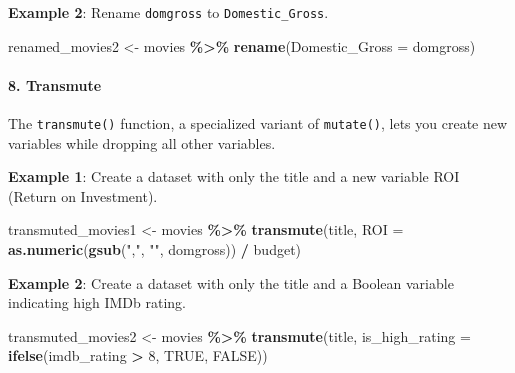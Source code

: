 \documentclass[
]{book}
\newenvironment{Shaded}{\begin{snugshade}}{\end{snugshade}}
\newcommand{\AttributeTok}[1]{\textcolor[rgb]{0.13,0.29,0.53}{#1}}
\newcommand{\ConstantTok}[1]{\textcolor[rgb]{0.56,0.35,0.01}{#1}}
\newcommand{\DecValTok}[1]{\textcolor[rgb]{0.00,0.00,0.81}{#1}}
\newcommand{\FunctionTok}[1]{\textcolor[rgb]{0.13,0.29,0.53}{\textbf{#1}}}
\newcommand{\NormalTok}[1]{#1}
\newcommand{\OtherTok}[1]{\textcolor[rgb]{0.56,0.35,0.01}{#1}}
\newcommand{\SpecialCharTok}[1]{\textcolor[rgb]{0.81,0.36,0.00}{\textbf{#1}}}
\newcommand{\StringTok}[1]{\textcolor[rgb]{0.31,0.60,0.02}{#1}}
\begin{document}
\textbf{Example 2}: Rename \texttt{domgross} to \texttt{Domestic\_Gross}.

\begin{Shaded}
\begin{Highlighting}[]
\NormalTok{renamed\_movies2 }\OtherTok{\textless{}{-}}\NormalTok{ movies }\SpecialCharTok{\%\textgreater{}\%}
  \FunctionTok{rename}\NormalTok{(}\AttributeTok{Domestic\_Gross =}\NormalTok{ domgross)}
\end{Highlighting}
\end{Shaded}

\paragraph*{8. Transmute}\label{transmute}

The \texttt{transmute()} function, a specialized variant of \texttt{mutate()}, lets you create new variables while dropping all other variables.

\textbf{Example 1}: Create a dataset with only the title and a new variable ROI (Return on Investment).

\begin{Shaded}
\begin{Highlighting}[]
\NormalTok{transmuted\_movies1 }\OtherTok{\textless{}{-}}\NormalTok{ movies }\SpecialCharTok{\%\textgreater{}\%}
  \FunctionTok{transmute}\NormalTok{(title, }\AttributeTok{ROI =} \FunctionTok{as.numeric}\NormalTok{(}\FunctionTok{gsub}\NormalTok{(}\StringTok{","}\NormalTok{, }\StringTok{""}\NormalTok{, domgross)) }\SpecialCharTok{/}\NormalTok{ budget)}
\end{Highlighting}
\end{Shaded}

\textbf{Example 2}: Create a dataset with only the title and a Boolean variable indicating high IMDb rating.

\begin{Shaded}
\begin{Highlighting}[]
\NormalTok{transmuted\_movies2 }\OtherTok{\textless{}{-}}\NormalTok{ movies }\SpecialCharTok{\%\textgreater{}\%}
  \FunctionTok{transmute}\NormalTok{(title, }\AttributeTok{is\_high\_rating =} \FunctionTok{ifelse}\NormalTok{(imdb\_rating }\SpecialCharTok{\textgreater{}} \DecValTok{8}\NormalTok{, }\ConstantTok{TRUE}\NormalTok{, }\ConstantTok{FALSE}\NormalTok{))}
\end{Highlighting}
\end{Shaded}
\end{document}
